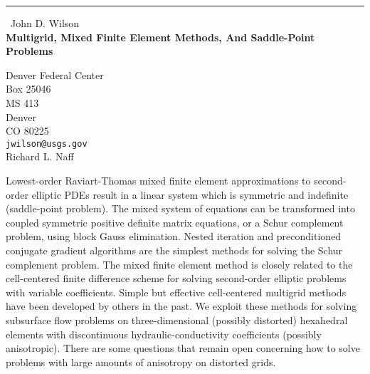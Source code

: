 \documentclass{report}
\begin{document}
\begin{center}
\rule{6in}{1pt} \
{\large John D. Wilson \\
{\bf Multigrid, Mixed Finite Element Methods, And Saddle-Point Problems}}

Denver Federal Center \\ Box 25046 \\ MS 413 \\ Denver \\ CO 80225
\\
{\tt jwilson@usgs.gov}\\
Richard L. Naff\end{center}

Lowest-order Raviart-Thomas mixed finite element approximations to
second-order elliptic PDEs result in a linear system which is symmetric
and indefinite (saddle-point problem). The mixed system of equations can
be transformed into coupled symmetric positive definite matrix equations,
or a Schur complement problem, using block Gauss elimination. Nested
iteration and preconditioned conjugate gradient algorithms are the
simplest methods for solving the Schur complement problem. The mixed
finite element method is closely related to the cell-centered finite
difference scheme for solving second-order elliptic problems with
variable coefficients.
Simple but effective cell-centered multigrid methods have
been developed by others in the past. We exploit these methods
for solving subsurface flow problems on three-dimensional
(possibly distorted) hexahedral elements with discontinuous
hydraulic-conductivity coefficients (possibly anisotropic).
There are some questions that remain open concerning
how to solve problems with large amounts of anisotropy on distorted grids.
\end{document}
